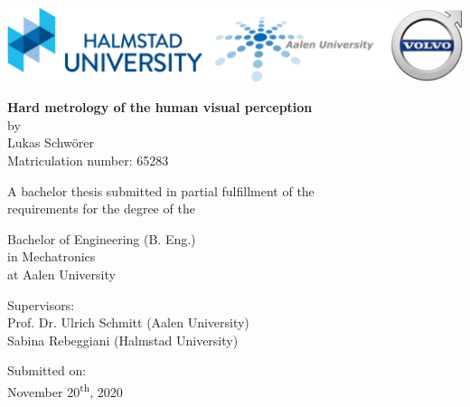 \begin{titlepage}
\center\includegraphics[width=140mm]{Pictures/TitlepageHead}
\vspace*{8mm} %
\begin{center} %
	
	\Huge\center\textbf{Hard metrology of the human visual perception}\\ %
	\vspace*{15mm}
	\Large{by}\\
	\Large{Lukas Schwörer}\\
	\Large{Matriculation number: 65283}\\
	
	\vspace*{11mm}
	
	\Large{A bachelor thesis submitted in partial fulfillment of the}\\
	\Large{requirements for the degree of the}\\
	
	\vspace*{11mm}
	
	\Large{Bachelor of Engineering (B. Eng.)}\\
	\Large{in Mechatronics}\\
	\Large{at Aalen University}\\
	
	\vspace*{11mm}
	
	\Large{Supervisors:}\\
	\Large{Prof. Dr. Ulrich Schmitt (Aalen University)}\\
	\Large{Sabina Rebeggiani (Halmstad University)}\\
	
	\vspace*{11mm}
	
	\Large{Submitted on:}\\
	\Large{November 20\textsuperscript{th}, 2020}\\
\end{center}
\end{titlepage}
